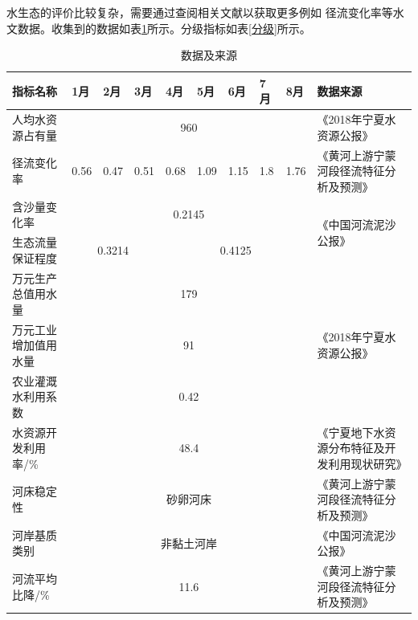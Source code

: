 \documentclass{whutmod}
\begin{document}
\begin{spacing}{1.2}
水生态的评价比较复杂，需要通过查阅相关文献以获取更多例如
径流变化率等水文数据。收集到的数据如表\ref{数据}所示。分级指标如表\ref{分级}所示。
\begin{table}[H]
	\centering
	\caption{数据及来源}\scriptsize
	  \begin{tabular}{p{6.8em}m{1cm}<{\centering}m{1cm}<{\centering}m{1cm}<{\centering}m{1cm}<{\centering}m{1cm}<{\centering}m{1cm}<{\centering}m{0.8cm}<{\centering}m{1cm}<{\centering}p{11.6em}}\toprule[1.5pt]
	  指标名称 & \multicolumn{1}{p{3.2em}}{1月} & \multicolumn{1}{p{3.2em}}{2月} & \multicolumn{1}{p{3.2em}}{3月} & \multicolumn{1}{p{3.2em}}{4月} & \multicolumn{1}{p{3.2em}}{5月} & \multicolumn{1}{p{3.2em}}{6月} & \multicolumn{1}{p{3.2em}}{7月} & \multicolumn{1}{p{3.2em}}{8月} & 数据来源 \\\hline
	  人均水资源占有量 & \multicolumn{8}{c}{960}                       & 《2018年宁夏水资源公报》 \\\hline
	  径流变化率 & 0.56 & 0.47 & 0.51 & 0.68 & 1.09 & 1.15 & 1.8 & 1.76 & 《黄河上游宁蒙河段径流特征分析及预测》 \\\hline
	  含沙量变化率 & \multicolumn{8}{c}{0.2145}                    & \multirow{2}[0]{*}{《中国河流泥沙公报》} \\
	  生态流量保证程度 & \multicolumn{3}{c}{0.3214} & \multicolumn{5}{c}{0.4125}  & \multicolumn{1}{c}{} \\\hline
	  万元生产总值用水量 & \multicolumn{8}{c}{179}                       & \multirow{3}[0]{*}{《2018年宁夏水资源公报》} \\
	  万元工业增加值用水量 & \multicolumn{8}{c}{91}                        & \multicolumn{1}{c}{} \\
	  农业灌溉水利用系数 & \multicolumn{8}{c}{0.42}                      & \multicolumn{1}{c}{} \\\hline
	  水资源开发利用率/\% & \multicolumn{8}{c}{48.4}                      & 《宁夏地下水资源分布特征及开发利用现状研究》 \\\hline
	  河床稳定性 & \multicolumn{8}{c}{砂卵河床}                & 《黄河上游宁蒙河段径流特征分析及预测》 \\\hline
	  河岸基质类别 & \multicolumn{8}{c}{非黏土河岸}               & 《中国河流泥沙公报》 \\\hline
	  河流平均比降/\% & \multicolumn{8}{c}{11.6}                      & 《黄河上游宁蒙河段径流特征分析及预测》 \\ \bottomrule[1.5pt]
	  \end{tabular}%
	\label{数据}%
  \end{table}%


\end{spacing}
\end{document}

